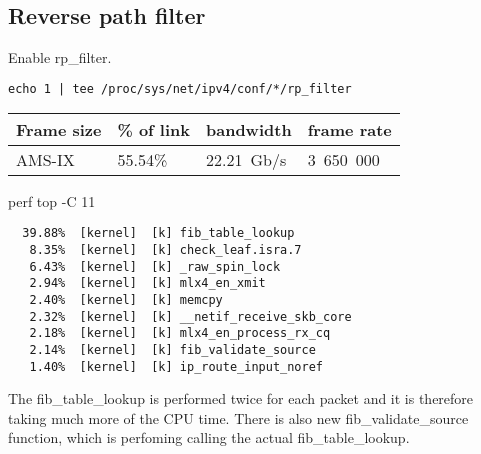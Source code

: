 
\subsection{Reverse path filter}

Enable rp\_filter.
\begin{lstlisting}[language=TeX]
echo 1 | tee /proc/sys/net/ipv4/conf/*/rp_filter
\end{lstlisting}

\begin{tabular}{ | l | l | l | l | }
\hline
Frame size & \% of link & bandwidth & frame rate \\
\hline
AMS-IX & 55.54\% & 22.21~Gb/s & 3~650~000 \\
\hline
\end{tabular}


perf top -C 11
\begin{lstlisting}
  39.88%  [kernel]  [k] fib_table_lookup
   8.35%  [kernel]  [k] check_leaf.isra.7
   6.43%  [kernel]  [k] _raw_spin_lock
   2.94%  [kernel]  [k] mlx4_en_xmit
   2.40%  [kernel]  [k] memcpy
   2.32%  [kernel]  [k] __netif_receive_skb_core
   2.18%  [kernel]  [k] mlx4_en_process_rx_cq
   2.14%  [kernel]  [k] fib_validate_source
   1.40%  [kernel]  [k] ip_route_input_noref
\end{lstlisting}
The fib\_table\_lookup is performed twice for each packet
and it is therefore taking much more of the CPU time.
There is also new fib\_validate\_source function, which is perfoming calling
the actual fib\_table\_lookup.
